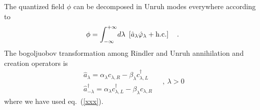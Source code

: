 \documentclass[12pt,oneside]{report}
\def\la{\lambda}
\begin{document}
The quantized field $\phi$ can be decomposed in Unruh modes
everywhere according to \begin{equation}
\phi = \int_{-\infty}^{+\infty} \!{ d \la}
\ \left[ \hat a_\la \hat \varphi_\la + \hbox{h.c.} \right ]\quad .
\label{threeoneb}
\end{equation}
The bogoljuobov transformation among 
Rindler and Unruh annihilation and
creation operators is
\begin{equation}
\begin{array}{c}
\hat a_\la = \alpha_\la c_{\la,R} - \beta_\la c^\dagger_{\la,L}\\
\hat a_{-\la}^\dagger = \alpha_\la c_{\la,L}^\dagger - \beta_\la
c_{\la,R}
\end{array} \quad , \ \la>0
\label{threetwo}
\end{equation}
where we have used eq.~(\ref{xxx}).
\end{document}
